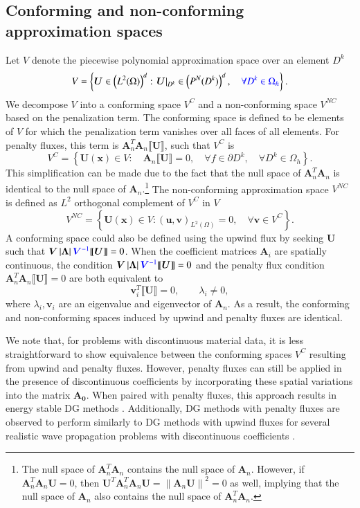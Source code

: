 \documentclass[preprint,10pt]{elsarticle}
\newcommand{\nor}[1]{\left\| #1 \right\|}
\newcommand{\LRp}[1]{\left( #1 \right)}
\newcommand{\LRb}[1]{\left| #1 \right|}
\newcommand{\LRc}[1]{\left\{ #1 \right\}}
\newcommand{\jump}[1] {\ensuremath{\llbracket#1\rrbracket}}
\newcommand{\Oh}{\Omega_h}
\newcommand{\note}[1]{{\color{blue}#1}}
\begin{document}
\subsection{Conforming and non-conforming approximation spaces}

Let $V$ denote the piecewise polynomial approximation space \note{over an element $D^k$}
\[
V = \LRc{ \bm{U} \in\LRp{ L^2(\Omega)}^d : \left.\bm{U}\right|_{D^k} \in \LRp{P^N(D^k)}^d, \quad \note{\forall D^k \in \Oh}}.  
\]
We decompose $V$ into a conforming space $V^C$ and a non-conforming space $V^{NC}$ based on the penalization term.  The conforming space is defined to be elements of $V$ for which the penalization term vanishes over all faces of all elements.  For penalty fluxes, \note{this term is $\bm{A}_n^T \bm{A}_n\jump{\bm{U}}$, such that} $V^C$ is
\begin{equation}
V^{C} = \LRc{ \bm{U}(\bm{x}) \in V: \quad  \bm{A}_n\jump{\bm{U}} = 0, \quad \forall f \in \partial D^k, \quad \forall D^k\in \Oh}.
\label{eq:conf}
\end{equation}
\note{This simplification can be made due to the fact that the null space of $\bm{A}_n^T\bm{A}_n$ is identical to the null space of $\bm{A}_n$.\footnote{\note{The null space of $\bm{A}_n^T\bm{A}_n$ contains the null space of $\bm{A}_n$.  However, if $\bm{A}_n^T\bm{A}_n\bm{U} = 0$, then $\bm{U}^T\bm{A}_n^T\bm{A}_n\bm{U} = \nor{\bm{A}_n\bm{U}}^2 = 0$ as well, implying that the null space of $\bm{A}_n$ also contains the null space of $\bm{A}_n^T\bm{A}_n$.
}}
}  
The non-conforming approximation space $V^{NC}$ is defined as $L^2$ orthogonal complement of $V^{C}$ in $V$
\[
V^{NC} = \LRc{ \bm{U}(\bm{x}) \in V: \LRp{\bm{u},\bm{v}}_{L^2(\Omega)} = 0, \quad \forall \bm{v}\in V^C}.
\]
A conforming space could also be defined using the upwind flux by seeking $\bm{U}$ such that $\bm{V}\LRb{\bm{\Lambda}}\note{\bm{V}^{-1}} \jump{\bm{U}} = 0$.  When the coefficient matrices $\bm{A}_i$ are spatially continuous, the condition $\bm{V}\LRb{\bm{\Lambda}}\note{\bm{V}^{-1}} \jump{\bm{U}} = 0$ and the penalty flux condition $\bm{A}_n^T \bm{A}_n\jump{\bm{U}} = 0$ are both equivalent to
\[
\bm{v}_i^T \jump{\bm{U}} = 0, \qquad \lambda_i \neq 0,
\]
where $\lambda_i, \bm{v}_i$ are an eigenvalue and eigenvector of $\bm{A}_n$.  As a result, the conforming and non-conforming spaces induced by upwind and penalty fluxes are identical.  

We note that, for problems with discontinuous material data, it is less straightforward to show equivalence between the conforming spaces $V^C$ resulting from upwind and penalty fluxes.  However, penalty fluxes can still be applied in the presence of discontinuous coefficients by incorporating these spatial variations into the matrix $\bm{A_0}$.  When paired with penalty fluxes, this approach results in energy stable DG methods \cite{chan2016weight1}.  Additionally, DG methods with penalty fluxes are observed to perform similarly to DG methods with upwind fluxes for several realistic wave propagation problems with discontinuous coefficients \cite{ye2016discontinuous}.  
\end{document}
